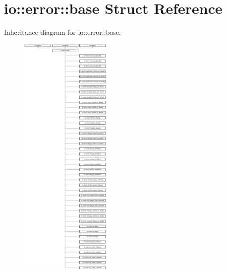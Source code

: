\hypertarget{structio_1_1error_1_1base}{}\section{io\+:\+:error\+:\+:base Struct Reference}
\label{structio_1_1error_1_1base}
Inheritance diagram for io\+:\+:error\+:\+:base\+:\begin{figure}[H]
\begin{center}
\leavevmode
\includegraphics[height=12.000000cm]{d6/d09/structio_1_1error_1_1base}
\end{center}
\end{figure}
